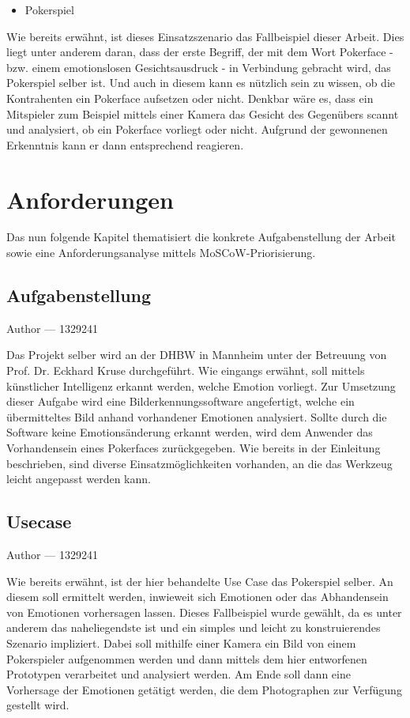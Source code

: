 \documentclass[12pt, a4paper]{report}
\makeatletter
\newcommand{\sectionauthor}[1]{%
  {\parindent0pt\vspace*{-5pt}%
  \large{Author --- }
  \linespread{1.1}\large\scshape#1%
  \par\nobreak\vspace*{35pt} }
  \@afterheading%
}
\makeatother
\begin{document}
\begin{itemize}
	\item{Pokerspiel}
\end{itemize}
Wie bereits erwähnt, ist dieses Einsatzszenario das Fallbeispiel dieser Arbeit. Dies liegt unter anderem daran, dass der erste Begriff, der mit dem Wort Pokerface - bzw. einem emotionslosen Gesichtsausdruck - in Verbindung gebracht wird, das Pokerspiel selber ist. Und auch in diesem kann es nützlich sein zu wissen, ob die Kontrahenten ein Pokerface aufsetzen oder nicht. Denkbar wäre es, dass ein Mitspieler zum Beispiel mittels einer Kamera das Gesicht des Gegenübers scannt und analysiert, ob ein Pokerface vorliegt oder nicht. Aufgrund der gewonnenen Erkenntnis kann er dann entsprechend reagieren.

\chapter{Anforderungen}
Das nun folgende Kapitel thematisiert die konkrete Aufgabenstellung der Arbeit sowie eine Anforderungsanalyse mittels MoSCoW-Priorisierung. 

\section{Aufgabenstellung}
\sectionauthor{1329241}
Das Projekt selber wird an der DHBW in Mannheim unter der Betreuung von Prof. Dr. Eckhard Kruse durchgeführt. Wie eingangs erwähnt, soll mittels künstlicher Intelligenz erkannt werden, welche Emotion vorliegt. Zur Umsetzung dieser Aufgabe wird eine Bilderkennungssoftware angefertigt, welche ein übermitteltes Bild anhand vorhandener Emotionen analysiert. Sollte durch die Software keine Emotionsänderung erkannt werden, wird dem Anwender das Vorhandensein eines Pokerfaces zurückgegeben. Wie bereits in der Einleitung beschrieben, sind diverse Einsatzmöglichkeiten vorhanden, an die das Werkzeug leicht angepasst werden kann.

\section{Usecase}
\sectionauthor{1329241}
Wie bereits erwähnt, ist der hier behandelte Use Case das Pokerspiel selber. An diesem soll ermittelt werden, inwieweit sich Emotionen oder das Abhandensein von Emotionen vorhersagen lassen. Dieses Fallbeispiel wurde gewählt, da es unter anderem das naheliegendste ist und ein simples und leicht zu konstruierendes Szenario impliziert. Dabei soll mithilfe einer Kamera ein Bild von einem Pokerspieler aufgenommen werden und dann mittels dem hier entworfenen Prototypen verarbeitet und analysiert werden. Am Ende soll dann eine Vorhersage der Emotionen getätigt werden, die dem Photographen zur Verfügung gestellt wird.
\end{document}
